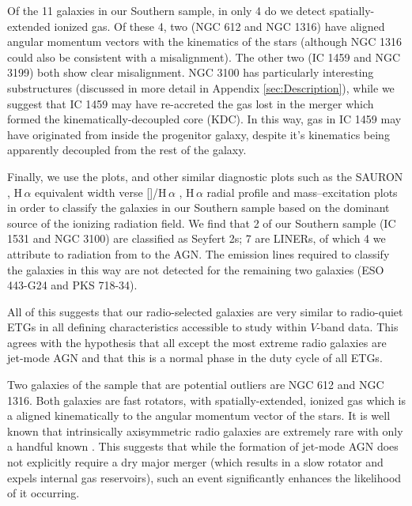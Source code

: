 Of the 11 galaxies in our Southern sample, in only 4 do we detect spatially-extended ionized gas. Of these 4, two (NGC 612 and NGC 1316) have aligned angular momentum vectors with the kinematics of the stars (although NGC 1316 could also be consistent with a misalignment). The other two (IC 1459 and NGC 3199) both show clear misalignment. NGC 3100 has particularly interesting substructures (discussed in more detail in Appendix \ref{sec:Description}), while we suggest that IC 1459 may have re-accreted the gas lost in the merger which formed the kinematically-decoupled core (KDC). In this way, gas in IC 1459 may have originated from inside the progenitor galaxy, despite it's kinematics being apparently decoupled from the rest of the galaxy. 

Finally, we use the \citet{Baldwin1981} plots, and other similar diagnostic plots such as the SAURON \citep{Sarzi2010}, H\,$\alpha$ equivalent width verse []/H\,$\alpha$ \citep[WHaN2;][]{CidFernandes2011}, H\,$\alpha$ radial profile and mass--excitation \citep[MEx;][]{Nyland2016} plots in order to classify the galaxies in our Southern sample based on the dominant source of the ionizing radiation field. We find that 2 of our Southern sample (IC 1531 and NGC 3100) are classified as Seyfert 2s; 7 are LINERs, of which 4 we attribute to radiation from to the AGN. The emission lines required to classify the galaxies in this way are not detected for the remaining two galaxies (ESO 443-G24 and PKS 718-34).

All of this suggests that our radio-selected galaxies are very similar to radio-quiet ETGs in all defining characteristics accessible to study within $V$-band data. This agrees with the hypothesis that all except the most extreme radio galaxies are jet-mode AGN and that this is a normal phase in the duty cycle of all ETGs. 

Two galaxies of the sample that are potential outliers are NGC 612 and NGC 1316. Both galaxies are fast rotators, with spatially-extended, ionized gas which is a aligned kinematically to the angular momentum vector of the stars. It is well known that intrinsically axisymmetric radio galaxies are extremely rare with only a handful known \citep[e.g.][]{Heckman1982, Ledlow1998, Hota2011a, Morganti2011, Mao2015}. This suggests that while the formation of jet-mode AGN does not explicitly require a dry major merger (which results in a slow rotator and expels internal gas reservoirs), such an event significantly enhances the likelihood of it occurring. 

